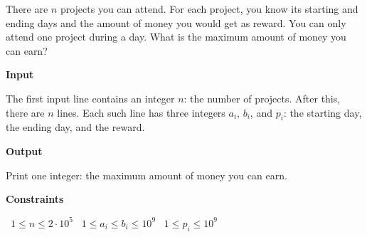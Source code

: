 There are $n$ projects you can attend. For each project, you know its starting and ending days and the amount of money you would get as reward. You can only attend one project during a day.
What is the maximum amount of money you can earn?

\vspace{0.3cm}\noindent\textbf{Input}

The first input line contains an integer $n$: the number of projects.
After this, there are $n$ lines. Each such line has three integers $a_i$, $b_i$, and $p_i$: the starting day, the ending day, and the reward.

\vspace{0.3cm}\noindent\textbf{Output}

Print one integer: the maximum amount of money you can earn.

\vspace{0.3cm}\noindent\textbf{Constraints}

\textbullet\ $1 \le n \le 2 \cdot 10^5$
\textbullet\ $1 \le a_i \le b_i \le 10^9$
\textbullet\ $1 \le p_i \le 10^9$